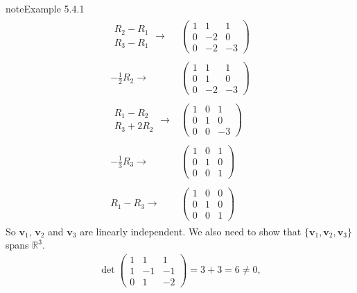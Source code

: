 \documentclass[letterpaper,10pt,english]{jupyterBook}
\begin{document}
\begin{sphinxadmonition}{note}{Example 5.4.1}
\begin{equation*}
\begin{split}
\begin{align*}
    \begin{matrix} R_2 - R_1 \\ R_3 - R_1 \end{matrix}\longrightarrow &
    \begin{pmatrix}
        1 & 1 & 1 \\
        0 & -2 & 0 \\
        0 & -2 & -3
    \end{pmatrix}
	\\ \\
    -\frac{1}{2} R_2\longrightarrow &
    \begin{pmatrix}
        1 & 1 & 1 \\
        0 & 1 & 0 \\
        0 & -2 & -3
    \end{pmatrix}
     \\\\
    \begin{matrix} R_1 - R_2 \\ R_3 + 2R_2 \end{matrix} \longrightarrow &
    \begin{pmatrix}
        1 & 0 & 1 \\
        0 & 1 & 0 \\
        0 & 0 & -3
    \end{pmatrix}
     \\ \\
    -\frac{1}{3}R_3 \longrightarrow &
    \begin{pmatrix}
        1 & 0 & 1 \\
        0 & 1 & 0 \\
        0 & 0 & 1
    \end{pmatrix}
    \\ \\
    R_1 - R_3\longrightarrow &
    \begin{pmatrix}
        1 & 0 & 0 \\
        0 & 1 & 0 \\
        0 & 0 & 1
    \end{pmatrix}
\end{align*} \end{split}
\end{equation*}
\sphinxAtStartPar
So \(\mathbf{v}_1\), \(\mathbf{v}_2\) and \(\mathbf{v}_3\) are linearly independent. We also need to show that \(\{ \mathbf{v}_1, \mathbf{v}_2, \mathbf{v}_3 \}\) spans \(\mathbb{R}^3\).
\begin{equation*}
\begin{split} \det \begin{pmatrix} 1 & 1 & 1 \\ 1 & -1 & -1 \\ 0 & 1 & -2 \end{pmatrix} = 3 + 3 = 6 \neq 0, \end{split}

\end{equation*}
\end{sphinxadmonition}
\end{document}
